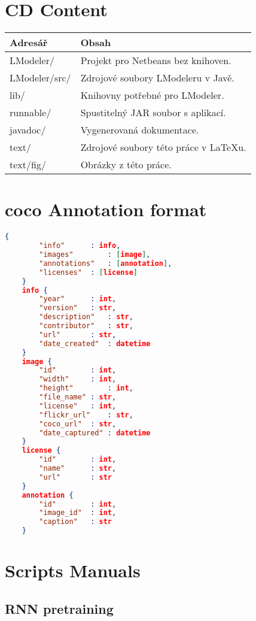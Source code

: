 \chapter{CD Content}


\begin{table}[h]
	\centering
	\renewcommand{\arraystretch}{1.2}
	\begin{tabular}{|l|l|}
		\hline
		Adresář & Obsah  \\
		\hline
		\hline
		LModeler/ & Projekt pro Netbeans bez knihoven. \\
		LModeler/src/ & Zdrojové soubory LModeleru v Javě. \\
		lib/ & Knihovny potřebné pro LModeler. \\
		runnable/ & Spustitelný JAR soubor s aplikací.\\
		javadoc/ & Vygenerovaná dokumentace. \\
		text/ & Zdrojové soubory této práce v LaTeXu. \\
		text/fig/ & Obrázky z této práce. \\
		\hline
	\end{tabular}
	\label{tab:cdcontent}
\end{table}

\chapter{\gls{coco} Annotation format} \label{chp:jsonAnnotation}
\begin{lstlisting}[language=json,firstnumber=1]
	{
		"info"		: info,
		"images"		: [image],
		"annotations"	: [annotation],
		"licenses"	: [license]
	}
	info {
		"year"		: int,
		"version"	: str,
		"description"	: str,
		"contributor"	: str,
		"url"		: str,
		"date_created"	: datetime
	}
	image {
		"id"		: int,
		"width"		: int,
		"height"		: int,
		"file_name"	: str,
		"license"	: int,
		"flickr_url"	: str,
		"coco_url"	: str,
		"date_captured"	: datetime
	}
	license {
		"id"		: int,
		"name"		: str,
		"url"		: str
	}
	annotation {
		"id"		: int,
		"image_id"	: int,
		"caption"	: str
	}
\end{lstlisting}

\chapter{Scripts Manuals}

\section{RNN pretraining}

